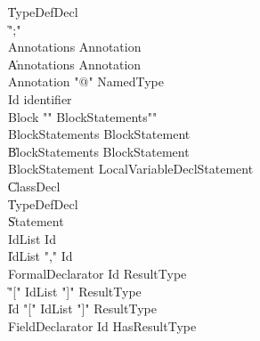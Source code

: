 \begin{grammar}
    \|   TypeDefDecl\\
    \|   \xcd";"\\
 Annotations  \:   Annotation\\
    \|   Annotations  Annotation\\
 Annotation  \:   \xcd"@"  NamedType\\
 Id  \:   identifier\\
 Block  \:   \xcd"{"  BlockStatements\opt  \xcd"}"\\
 BlockStatements  \:   BlockStatement\\
    \|   BlockStatements  BlockStatement\\
 BlockStatement  \:   LocalVariableDeclStatement\\
    \|   ClassDecl\\
    \|   TypeDefDecl\\
    \|   Statement\\
 IdList  \:   Id\\
    \|   IdList  \xcd","  Id\\
 FormalDeclarator  \:   Id  ResultType\\
    \|   \xcd"["  IdList  \xcd"]"  ResultType\\
    \|   Id  \xcd"["  IdList  \xcd"]"  ResultType\\
 FieldDeclarator  \:   Id  HasResultType\\
\end{grammar}

